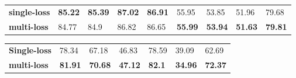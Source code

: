 \documentclass[11pt]{article}
\begin{document}
\begin{table*}
\centering
\begin{subtable}{\textwidth}
\centering
\small
\setlength{\tabcolsep}{3pt}
\renewcommand{\arraystretch}{1.2}
\begin{tabular}{lllllllll}
\hline
 &  &  &  &  &  &  &  &  \\ \hline
\textbf{single-loss} & \textbf{85.22} & \textbf{85.39} & \textbf{87.02} & \textbf{86.91} & 55.95 & 53.85 & 51.96 & 79.68 \\ \hline
\textbf{multi-loss} & 84.77 & 84.9 & 86.82 & 86.65 & \textbf{55.99} & \textbf{53.94} & \textbf{51.63} & \textbf{79.81} \\ \hline
\end{tabular}
\caption{CMU-MOSEI}
\label{tab:CMU-MOSEI3}
\end{subtable}
\vspace{0.3cm}
\begin{subtable}{\textwidth}
\centering
\small
\setlength{\tabcolsep}{3pt}
\renewcommand{\arraystretch}{1.2}
\begin{tabular}{lllllll}
\hline
 &  &  &  &  &  &  \\ \hline
\textbf{Single-loss} & 78.34 & 67.18 & 46.83 & 78.59 & 39.09 & 62.69 \\ \hline
\textbf{multi-loss} & \textbf{81.91} & \textbf{70.68} & \textbf{47.12} & \textbf{82.1} & \textbf{34.96} & \textbf{72.37} \\ \hline
\end{tabular}
\caption{CH-SIMS}
\label{tab:CH-SIMS3}
\end{subtable}
\caption{\textbf{Single-Loss Training vs.~Multi-Loss Training}: While multi-loss training does not yield performance improvement when identical labels are used for different losses, as in the case of CMU-MOSEI, it does contribute significantly to performance enhancement when unique labels are assigned to each modality, as observed with CH-SIMS.}
\label{tab:Performance4}
\end{table*}
\end{document}
